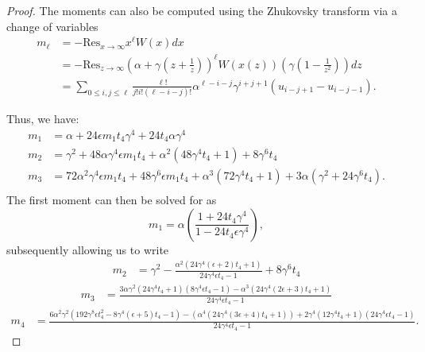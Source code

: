 \documentclass[10pt]{article}
\theoremstyle{plain}
\theoremstyle{definition}
\theoremstyle{plain}
\begin{document}
\begin{proof}
	
	The moments can also be computed using the Zhukovsky transform via a change of variables
	\begin{align}\label{eq:residue formula for moments one-cut}
		m_{\ell} &= - \text{Res}_{x\rightarrow \infty} x^{\ell} W(x) dx\\
		&= - \text{Res}_{z\rightarrow \infty} \left(\alpha + \gamma\left(z+\frac{1}{z}\right) \right)^{\ell} W(x(z)) \left( \gamma\left(1-\frac{1}{z^2}\right)\right)dz\\
		&= \sum_{0\leq i,j\leq\ell} \frac{\ell!}{j! i!(\ell-i-j)!}\alpha^{\ell-i-j}\gamma^{i+j+1}(u_{i-j+1}-u_{i-j-1}).
	\end{align}
	
	Thus, we have:
	\begin{align*}
		m_{1} &=\alpha + 24 \epsilon m_1 t_4 \gamma^4 + 24 t_4 \alpha \gamma^4\\
		m_2 &=\gamma ^2+48 \alpha \gamma ^4 \epsilon m_{1} t_{4}+\alpha ^2 \left(48 \gamma ^4
 t_{4}+1\right)+8 \gamma ^6 t_{4}\\
		m_3 & =72 \alpha ^2 \gamma ^4 \epsilon m_{1} t_{4}+48 \gamma ^6 \epsilon m_{1}
 t_{4}+\alpha ^3 \left(72 \gamma ^4 t_{4}+1\right)+3 \alpha \left(\gamma ^2+24 \gamma ^6
 t_{4}\right).\\
	\end{align*}
	The first moment can then be solved for as
	\begin{equation}\label{eq:m1 one-cut}
		m_1 = \alpha \left(\frac{1+24 t_{4}\gamma^4}{1-24 t_{4}\epsilon\gamma^4}\right),
	\end{equation}
	subsequently allowing us to write
	\begin{align}\label{eq:m2 one-cut}
		m_{2} &=\gamma ^2-\frac{\alpha ^2 \left(24 \gamma ^4 (\epsilon+2) t_{4}+1\right)}{24 \gamma ^4
 \epsilon t_{4}-1}+8 \gamma ^6 t_{4}
 \end{align}
 \begin{align}\label{eq:m3 one-cut}
		m_3 &=\frac{3 \alpha \gamma ^2 \left(24 \gamma ^4 t_{4}+1\right) \left(8 \gamma ^4 \epsilon
 t_{4}-1\right)-\alpha ^3 \left(24 \gamma ^4 (2 \epsilon+3) t_{4}+1\right)}{24 \gamma ^4
 \epsilon t_{4}-1}
 \end{align}
 \begin{align}\label{eq:m4 one-cut}
 m_{4} &=\frac{6 \alpha ^2 \gamma ^2 \left(192 \gamma ^8 \epsilon t_{4}^2-8 \gamma ^4 (\epsilon+5)
 t_{4}-1\right)-\left(\alpha ^4 \left(24 \gamma ^4 (3 \epsilon+4) t_{4}+1\right)\right)+2
 \gamma ^4 \left(12 \gamma ^4 t_{4}+1\right) \left(24 \gamma ^4 \epsilon
 t_{4}-1\right)}{24 \gamma ^4 \epsilon t_{4}-1}.
	\end{align}
 

\end{proof}
\end{document}
